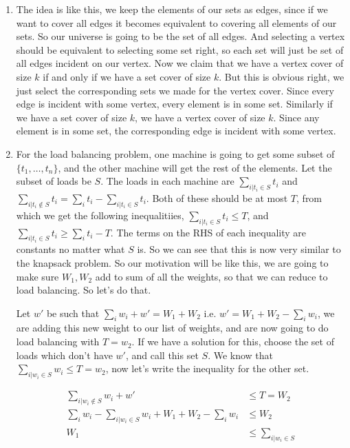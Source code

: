 \documentclass[12pt]{report}
\begin{document}
\begin{enumerate}[label=\textbf{\arabic*.}]
    \item The idea is like this, we keep the elements of our sets as edges, since if we want to cover all edges it becomes equivalent to
    covering all elements of our sets. So our universe is going to be the set of all edges.
    And selecting a vertex should be equivalent to selecting some set right, so each set will just be set of all edges incident on our vertex.
    Now we claim that we have a vertex cover of size $k$ if and only if we have a set cover of size $k$. But this is obvious right, we just 
    select the corresponding sets we made for the vertex cover. Since every edge is incident with some vertex, every element is in some set.
    Similarly if we have a set cover of size $k$, we have a vertex cover of size $k$. Since any element is in some set, the corresponding edge 
    is incident with some vertex.

    \item For the load balancing problem, one machine is going to get some subset of $\{t_1, \dots, t_n\}$, and the other machine will get
    the rest of the elements. Let the subset of loads be $S$. The loads in each machine are $\sum_{i|t_i \in S} t_i$ and 
    $\sum_{i|t_i \notin S} t_i = \sum_i t_i - \sum_{i|t_i \in S} t_i$. Both of these should be at most $T$, from which we get the following 
    inequalitiies, $\sum_{i|t_i \in S} t_i \leq T$, and $\sum_{i|t_i \in S} t_i \geq \sum_i t_i - T$. The terms on the RHS of each inequality are 
    constants no matter what $S$ is. So we can see that this is now very similar to the knapsack problem. So our motivation will be like this,
    we are going to make sure $W_1, W_2$ add to sum of all the weights, so that we can reduce to load balancing. So let's do that.

    Let $w'$ be such that $\sum_i w_i + w' = W_1 + W_2$ i.e. $w' = W_1 + W_2 - \sum_i w_i$, we are adding this new weight to our list of weights,
    and are now going to do load balancing with $T = w_2$. If we have a solution for this, choose the set of loads which don't have $w'$, and 
    call this set $S$. We know that $\sum_{i|w_i \in S} w_i \leq T = w_2$, now let's write the inequality for the other set.

    \begin{align*}
        \sum_{i|w_i \notin S} w_i + w' &\leq T = W_2 \\
        \sum_i w_i - \sum_{i|w_i \in S} w_i + W_1 + W_2 - \sum_i w_i &\leq W_2 \\
        W_1 &\leq \sum_{i|w_i \in S} 
    \end{align*}


\end{enumerate}
\end{document}
